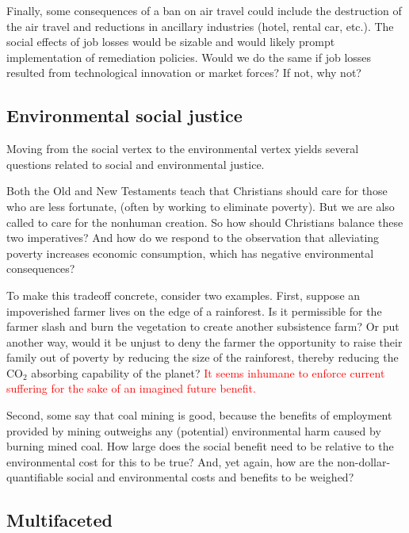 \documentclass[12pt]{article}
\newcommand{\ins}[1]{\textcolor{red}{#1}}
\begin{document}
Finally, some consequences of a ban on air travel 
could include the destruction of the air travel and 
reductions in ancillary industries (hotel, rental car, etc.).
The social effects of job losses would be sizable and 
would likely prompt implementation of remediation policies.
Would we do the same if job losses resulted from technological innovation or market forces?
If not, why not?


\subsection{Environmental social justice}
\label{sec:environmental_social_justice}

Moving from the social vertex to the environmental vertex 
yields several questions related to social and environmental justice. 

Both the Old and New Testaments teach that Christians should care for those who are less fortunate,
(often by working to eliminate poverty). 
But we are also called to care for the nonhuman creation.
So how should Christians balance these two imperatives?
And how do we respond to the observation that alleviating poverty 
increases economic consumption, which has negative environmental consequences?

To make this tradeoff concrete, consider two examples.
First, suppose an impoverished farmer lives on the edge of a rainforest. 
Is it permissible for the farmer slash and burn the vegetation to create another subsistence farm?
Or put another way, would it be unjust to deny the farmer the opportunity to raise their family
out of poverty by reducing the size of the rainforest, 
thereby reducing the CO$_2$ absorbing capability of the planet? \ins{It seems inhumane to 
enforce current suffering for the sake of an imagined future benefit.}

Second, some say that coal mining is good,
because the benefits of employment provided by mining outweighs
any (potential) environmental harm caused by burning mined coal. 
How large does the social benefit need to be relative to the environmental cost 
for this to be true?
And, yet again, how are the non-dollar-quantifiable 
social and environmental costs and benefits to be weighed? 


\subsection{Multifaceted}
\label{sec:multifaceted}
\end{document}
